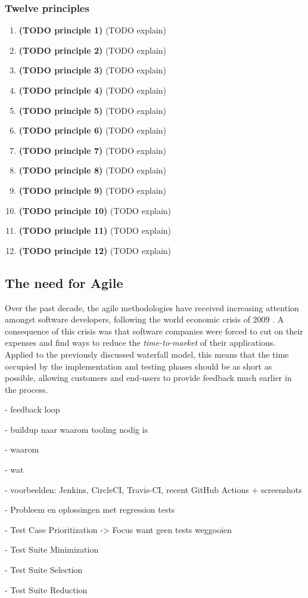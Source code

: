 \subsubsection{Twelve principles}
\begin{enumerate}
	\item \textbf{(TODO principle 1)} (TODO explain)
	\item \textbf{(TODO principle 2)} (TODO explain)
	\item \textbf{(TODO principle 3)} (TODO explain)
	\item \textbf{(TODO principle 4)} (TODO explain)
	\item \textbf{(TODO principle 5)} (TODO explain)
	\item \textbf{(TODO principle 6)} (TODO explain)
	\item \textbf{(TODO principle 7)} (TODO explain)
	\item \textbf{(TODO principle 8)} (TODO explain)
	\item \textbf{(TODO principle 9)} (TODO explain)
	\item \textbf{(TODO principle 10)} (TODO explain)
	\item \textbf{(TODO principle 11)} (TODO explain)
	\item \textbf{(TODO principle 12)} (TODO explain)
\end{enumerate}

\subsection{The need for Agile}
Over the past decade, the agile methodologies have received increasing attention amongst software developers, following the world economic crisis of 2009 \cite{ionel2009}. A consequence of this crisis was that software companies were forced to cut on their expenses and find ways to reduce the \emph{time-to-market} of their applications. Applied to the previously discussed waterfall model, this means that the time occupied by the implementation and testing phases should be as short as possible, allowing customers and end-users to provide feedback much earlier in the process.

- feedback loop

- buildup naar waarom tooling nodig is

- waarom

- wat

- voorbeelden: Jenkins, CircleCI, Travis-CI, recent GitHub Actions + screenshots

- Probleem en oplossingen met regression tests

  - Test Case Prioritization -> Focus want geen tests weggooien
  
  - Test Suite Minimization
  
  - Test Suite Selection
  
  - Test Suite Reduction
